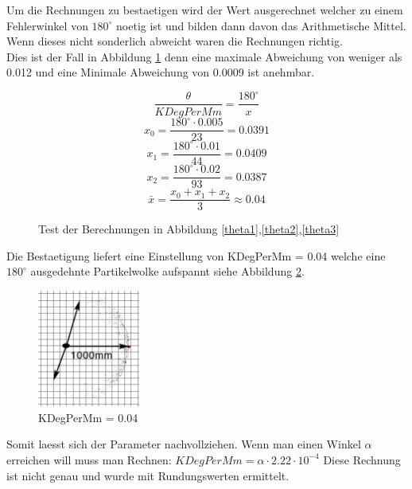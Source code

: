 \documentclass{article}
\begin{document}
Um die Rechnungen zu bestaetigen wird der Wert ausgerechnet welcher zu einem Fehlerwinkel von $180^\circ$ noetig ist und bilden dann davon das Arithmetische Mittel. Wenn dieses nicht sonderlich abweicht waren die Rechnungen richtig. \\ Dies ist der Fall in Abbildung \ref{testCalacAll} denn eine maximale Abweichung von weniger als 0.012 und eine Minimale Abweichung von 0.0009 ist anehmbar. 

\begin{figure}
	\begin{equation}\label{get0005Y}	
		\frac{\theta}{KDegPerMm}=\frac{180^\circ}{x}
	\end{equation}
	\begin{equation}\label{get0005Y}	
		{x_0}=\frac{180^\circ \cdot 0.005}{23}=0.0391
	\end{equation}
	\begin{equation}\label{get0005Y}	
		{x_1}=\frac{180^\circ \cdot 0.01}{44}=0.0409
	\end{equation}
	\begin{equation}\label{get0005Y}	
		{x_2}=\frac{180^\circ \cdot 0.02}{93}=0.0387
	\end{equation}
	\begin{equation}\label{get0005Y}
		\bar{x}=\frac{x_0+x_1+x_2}{3} \approx 0.04
	\end{equation}
  \caption{Test der Berechnungen in Abbildung \ref{theta1},\ref{theta2},\ref{theta3}}
  \label{testCalacAll}
\end{figure}

Die Bestaetigung liefert eine Einstellung von KDegPerMm = 0.04 welche eine $180^\circ$ ausgedehnte Partikelwolke aufspannt siehe Abbildung \ref{KDegPerMm004Test}.

\begin{figure}
	\centering
	\includegraphics[width=0.3\textwidth]{img/KDegPerMm004.jpg}
	\caption{KDegPerMm = 0.04}
	  \label{KDegPerMm004Test}
\end{figure}

Somit laesst sich der Parameter nachvollziehen. Wenn man einen Winkel $\alpha$ erreichen will muss man Rechnen: $KDegPerMm = \alpha \cdot 2.22 \cdot 10^{-4}$
Diese Rechnung ist nicht genau und wurde mit Rundungswerten ermittelt. 
\newpage
\end{document}
